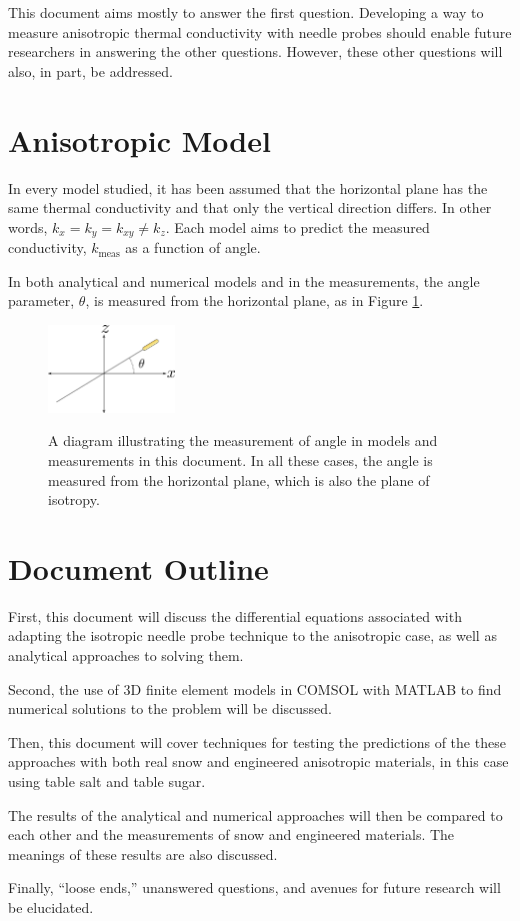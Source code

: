 This document aims mostly to answer the first question. Developing a way
to measure anisotropic thermal conductivity with needle probes should enable
future researchers in answering the other questions. However, these other
questions will also, in part, be addressed.

\section{Anisotropic Model}

In every model studied, it has been assumed that the horizontal plane has the
same thermal conductivity and that only the vertical direction differs. In other
words, \(k_x = k_y = k_{xy} \ne k_z\). Each model aims to predict the measured
conductivity, \(k_{\textrm{meas}}\) as a function of angle.

In both analytical and numerical models and in the measurements, the angle
parameter, \(\theta\), is measured from the horizontal plane, as in Figure 
\ref{fig:angle}.

\begin{figure}[h]
\centering
\includegraphics[width=0.3\textwidth]{fig/angle.png}
\label{fig:angle}
\caption{A diagram illustrating the measurement of angle in models and
measurements in this document. In all these cases, the angle is measured from
the horizontal plane, which is also the plane of isotropy. }
\end{figure}


\section{Document Outline}

First, this document will discuss the differential equations associated with
adapting the isotropic needle probe technique to the anisotropic case, as well
as analytical approaches to solving them. 

Second, the use of 3D finite element models in COMSOL with MATLAB to find 
numerical solutions to the problem will be discussed.

Then, this document will cover techniques for testing the predictions of the
these approaches with both real snow and engineered anisotropic materials, in
this case using table salt and table sugar.

The results of the analytical and numerical approaches will then be compared to
each other and the measurements of snow and engineered materials. The meanings
of these results are also discussed.

Finally, ``loose ends,'' unanswered questions, and avenues for future research
will be elucidated.
